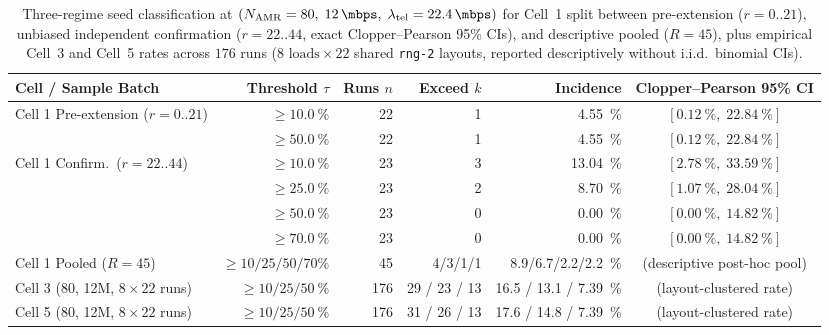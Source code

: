\documentclass[11pt,a4paper]{article}
\newcommand{\Namr}{\ensuremath{N_{\mathrm{AMR}}}}
\newcommand{\ltel}{\ensuremath{\lambda_{\mathrm{tel}}}}
\begin{document}
\begin{table}[!tb]
\centering
\scriptsize
\setlength{\tabcolsep}{2.0pt}
\caption{Three-regime seed classification at $(\Namr=80,\; \qty{12}{\mbps},\; \ltel=\qty{22.4}{\mbps})$ for Cell~1 split between pre-extension ($r=0..21$), unbiased independent confirmation ($r=22..44$, exact Clopper--Pearson 95\% CIs), and descriptive pooled ($R=45$), plus empirical Cell~3 and Cell~5 rates across $176$ runs ($8\text{ loads} \times 22$ shared \texttt{rng-2} layouts, reported descriptively without i.i.d.\ binomial CIs).}
\label{tab:collapse_incidence}
\begin{tabular}{@{}l r r r r c@{}}
\toprule
\textbf{Cell / Sample Batch} & \textbf{Threshold $\tau$} & \textbf{Runs $n$} & \textbf{Exceed $k$} & \textbf{Incidence} & \textbf{Clopper--Pearson 95\% CI} \\
\midrule
Cell 1 Pre-extension ($r=0..21$) & $\ge \qty{10.0}{\percent}$ & 22 & 1 & \qty{4.55}{\percent} & $[\qty{0.12}{\percent},\; \qty{22.84}{\percent}]$ \\
 & $\ge \qty{50.0}{\percent}$ & 22 & 1 & \qty{4.55}{\percent} & $[\qty{0.12}{\percent},\; \qty{22.84}{\percent}]$ \\
\midrule
Cell 1 Confirm.\ ($r=22..44$) & $\ge \qty{10.0}{\percent}$ & 23 & 3 & \qty{13.04}{\percent} & $[\qty{2.78}{\percent},\; \qty{33.59}{\percent}]$ \\
 & $\ge \qty{25.0}{\percent}$ & 23 & 2 & \qty{8.70}{\percent} & $[\qty{1.07}{\percent},\; \qty{28.04}{\percent}]$ \\
 & $\ge \qty{50.0}{\percent}$ & 23 & 0 & \qty{0.00}{\percent} & $[\qty{0.00}{\percent},\; \qty{14.82}{\percent}]$ \\
 & $\ge \qty{70.0}{\percent}$ & 23 & 0 & \qty{0.00}{\percent} & $[\qty{0.00}{\percent},\; \qty{14.82}{\percent}]$ \\
\midrule
Cell 1 Pooled ($R=45$) & $\ge 10/25/50/70\%$ & 45 & 4/3/1/1 & 8.9/6.7/2.2/\qty{2.2}{\percent} & (descriptive post-hoc pool) \\
\midrule
Cell 3 (80, 12M, $8\times 22$ runs) & $\ge 10 / 25 / \qty{50}{\percent}$ & 176 & 29 / 23 / 13 & 16.5 / 13.1 / \qty{7.39}{\percent} & (layout-clustered rate) \\
Cell 5 (80, 12M, $8\times 22$ runs) & $\ge 10 / 25 / \qty{50}{\percent}$ & 176 & 31 / 26 / 13 & 17.6 / 14.8 / \qty{7.39}{\percent} & (layout-clustered rate) \\
\bottomrule
\end{tabular}
\end{table}
\end{document}

